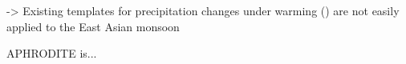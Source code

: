 \documentclass[draft,grl]{AGUTeX}
\begin{document}
\begin{article}
-> Existing templates for precipitation changes under warming (\citep{Held2006}\citep{Lintner2007}\citep{Chou2009}) are not easily applied to the East Asian monsoon



\begin{acknowledgments}
APHRODITE is... 
\end{acknowledgments}

%
%
%
%
%
%
%
%
%




%
%
\end{article}
\end{document}
